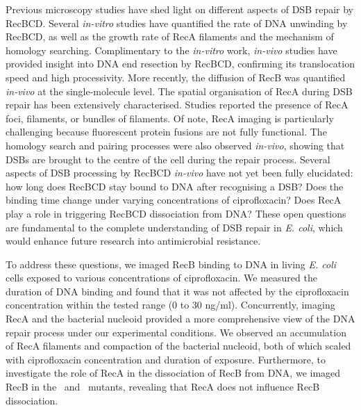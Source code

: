 Previous microscopy studies have shed light on different aspects of DSB repair by RecBCD. Several \emph{in-vitro} studies have quantified the rate of DNA unwinding by RecBCD\cite{Spies2003,Liu2013}, as well as the growth rate of RecA filaments\cite{Joo2006,Galletto2006,Handa2009} and the mechanism of homology searching\cite{Forget2012,Ragunathan2012}. Complimentary to the \emph{in-vitro} work, \emph{in-vivo} studies have provided insight into DNA end resection by RecBCD\cite{Wiktor2018}, confirming its translocation speed and high processivity. More recently, the diffusion of RecB was quantified \emph{in-vivo} at the single-molecule level\cite{Lepore2023}. The spatial organisation of RecA during DSB repair has been extensively characterised. Studies reported the presence of RecA foci\cite{Renzette2005,Renzette2007,Centore2007,Amarh2018}, filaments\cite{Kidane2005}, or bundles of filaments\cite{Lesterlin2013,Ghodke2019}. Of note, RecA imaging is particularly challenging because fluorescent protein fusions are not fully functional. The homology search and pairing processes were also observed \emph{in-vivo}, showing that DSBs are brought to the centre of the cell during the repair process\cite{Badrinarayanan2015,Wiktor2021}. Several aspects of DSB processing by RecBCD \emph{in-vivo} have not yet been fully elucidated: how long does RecBCD stay bound to DNA after recognising a DSB? Does the binding time change under varying concentrations of ciprofloxacin? Does RecA play a role in triggering RecBCD dissociation from DNA? These open questions are fundamental to the complete understanding of DSB repair in \emph{E. coli}, which would enhance future research into antimicrobial resistance.

To address these questions, we imaged RecB binding to DNA in living \emph{E. coli} cells exposed to various concentrations of ciprofloxacin. We measured the duration of DNA binding and found that it was not affected by the ciprofloxacin concentration within the tested range (0 to 30 ng/ml). Concurrently, imaging RecA and the bacterial nucleoid provided a more comprehensive view of the DNA repair process under our experimental conditions. We observed an accumulation of RecA filaments and compaction of the bacterial nucleoid, both of which scaled with ciprofloxacin concentration and duration of exposure. Furthermore, to investigate the role of RecA in the dissociation of RecB from DNA, we imaged RecB in the \dreca\ and \teneighty\ mutants, revealing that RecA does not influence RecB dissociation.
